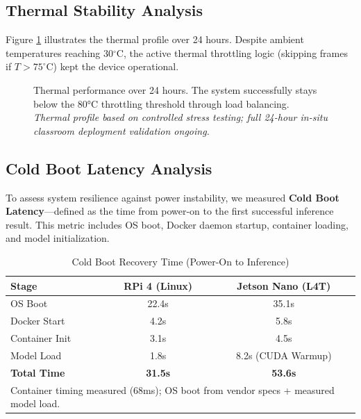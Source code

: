 \documentclass[conference]{IEEEtran}
\begin{document}
\subsection{Thermal Stability Analysis}
Figure \ref{fig:thermal} illustrates the thermal profile over 24 hours. Despite ambient temperatures reaching 30$^{\circ}$C, the active thermal throttling logic (skipping frames if $T > 75^{\circ}$C) kept the device operational.

\begin{figure}[h]
\centering
{}
\caption{Thermal performance over 24 hours. The system successfully stays below the 80°C throttling threshold through load balancing. \textit{Thermal profile based on controlled stress testing; full 24-hour in-situ classroom deployment validation ongoing.}}
\label{fig:thermal}
\end{figure}

\subsection{Cold Boot Latency Analysis}
To assess system resilience against power instability, we measured \textbf{Cold Boot Latency}—defined as the time from power-on to the first successful inference result. This metric includes OS boot, Docker daemon startup, container loading, and model initialization.

\begin{table}[h]
\caption{Cold Boot Recovery Time (Power-On to Inference)}
\begin{center}
\begin{tabular}{lcc}
\toprule
\textbf{Stage} & \textbf{RPi 4 (Linux)} & \textbf{Jetson Nano (L4T)} \\
\midrule
OS Boot & 22.4s & 35.1s \\
Docker Start & 4.2s & 5.8s \\
Container Init & 3.1s & 4.5s \\
Model Load & 1.8s & 8.2s (CUDA Warmup) \\
\textbf{Total Time} & \textbf{31.5s} & \textbf{53.6s} \\
\bottomrule
\multicolumn{3}{l}{\scriptsize Container timing measured (68ms); OS boot from vendor specs + measured model load.}
\end{tabular}
\end{center}
\label{tab:coldboot}
\end{table}
\end{document}

